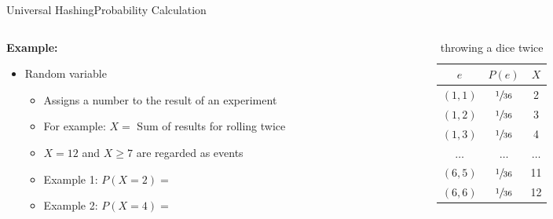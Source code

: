 \begin{frame}{Universal Hashing}{Probability Calculation}
  \begin{columns}
    \begin{column}{0.55\linewidth}
      \textbf{Example:}
      \begin{itemize}
      \setlength\itemsep{1em}
      \item<1->
        Random variable
        \begin{itemize}
        \item<2->
          Assigns a number to the result of an experiment
        \item<3->
          For example: {\color{MainA}$X =$}
          Sum of results for rolling twice
        \item<4->
          {\color{MainA}$X = 12$} and {\color{MainA}$X \geq 7$}
          are regarded as events
        \item<5->
          Example 1: {\color{MainA}$P(X = 2) = $}
        \item<6->
          Example 2: {\color{MainA}$P(X = 4) = $}
        \end{itemize}
      \end{itemize}
    \end{column}
    \begin{column}{0.45\linewidth}
      \begin{table}[!h]
        \caption{throwing a dice twice}
        \label{tab:probabilities:rolling_dice_twice2}
        \begin{tabularx}{0.95\linewidth}{c|cc}
          {\color{MainA}$e$} & {\color{MainA}$P(e)$} &
          {\color{MainA}$X$}\\
          \midrule
          $(1, 1)$ & $\sfrac{1}{36}$ & 2\\
          $(1, 2)$ & $\sfrac{1}{36}$ & 3\\
          $(1, 3)$ & $\sfrac{1}{36}$ & 4\\
          $\dots$ & $\dots$ & $\dots$\\
          $(6, 5)$ & $\sfrac{1}{36}$ & 11\\
          $(6, 6)$ & $\sfrac{1}{36}$ & 12\\
        \end{tabularx}
      \end{table}
    \end{column}
  \end{columns}
\end{frame}

